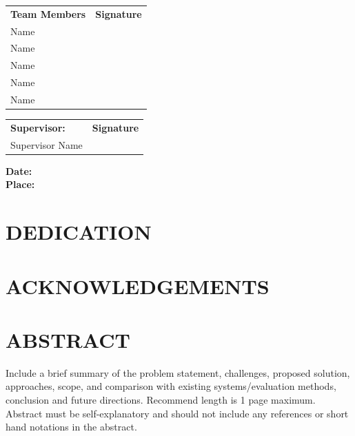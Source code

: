 \documentclass[12pt, a4paper]{report}
\begin{document}
\vspace{1in}
\noindent
\begin{tabular}{@{}p{3in} p{3in}@{}}
\textbf{Team Members} & \textbf{Signature} \\
Name & \hrulefill \\
Name & \hrulefill \\
Name & \hrulefill \\
Name & \hrulefill \\
Name & \hrulefill \\
\end{tabular}

\vspace{1in}
\noindent
\begin{tabular}{@{}p{3in} p{3in}@{}}
\textbf{Supervisor:} & \textbf{Signature} \\
Supervisor Name & \hrulefill \\
\end{tabular}

\vspace{0.5in}
\noindent
\textbf{Date:} \\
\textbf{Place:}

\clearpage

\chapter*{DEDICATION}

\chapter*{ACKNOWLEDGEMENTS}

\clearpage

\tableofcontents
\clearpage
\listoffigures
{}
\clearpage
\listoftables
{}
\clearpage

\chapter*{ABSTRACT}
Include a brief summary of the problem statement, challenges, proposed solution, approaches, scope, and comparison with existing systems/evaluation methods, conclusion and future directions. Recommend length is 1 page maximum. Abstract must be self-explanatory and should not include any references or short hand notations in the abstract.
\end{document}
